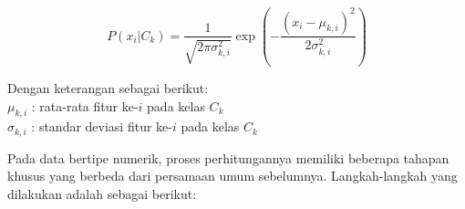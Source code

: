 \begin{equation}
	P(x_i | C_k) = \frac{1}{\sqrt{2\pi\sigma_{k,i}^2}} \exp \left( -\frac{(x_i - \mu_{k,i})^2}{2\sigma_{k,i}^2} \right)
	\label{eq:gaussian}
\end{equation}


\noindent
Dengan keterangan sebagai berikut:\\[0.5em]
\hspace*{1.5em}$\mu_{k,i}$ \hspace{0.4em}: rata-rata fitur ke-$i$ pada kelas $C_k$\\
\hspace*{1.5em}$\sigma_{k,i}$ : standar deviasi fitur ke-$i$ pada kelas $C_k$

Pada data bertipe numerik, proses perhitungannya memiliki beberapa tahapan khusus yang berbeda dari persamaan umum sebelumnya. Langkah-langkah yang dilakukan adalah sebagai berikut:

